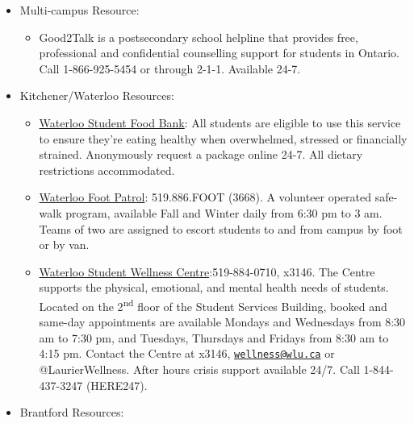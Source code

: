 \documentclass[
  letterpaper,
  DIV=11,
  numbers=noendperiod]{scrartcl}
\providecommand{\tightlist}{%
  \setlength{\itemsep}{0pt}\setlength{\parskip}{0pt}}\usepackage{longtable,booktabs,array}
\begin{document}
\begin{itemize}
\item
  Multi-campus Resource:

  \begin{itemize}
  \tightlist
  \item
    Good2Talk is a postsecondary school helpline that provides free,
    professional and confidential counselling support for students in
    Ontario. Call 1-866-925-5454 or through 2-1-1. Available 24-7.
  \end{itemize}
\item
  Kitchener/Waterloo Resources:

  \begin{itemize}
  \item
    \href{http://yourstudentsunion.ca/service/food-bank/}{Waterloo
    Student Food Bank}: All students are eligible to use this service to
    ensure they're eating healthy when overwhelmed, stressed or
    financially strained. Anonymously request a package online 24-7. All
    dietary restrictions accommodated.
  \item
    \href{http://yourstudentsunion.ca/service/foot-patrol/}{Waterloo
    Foot Patrol}: 519.886.FOOT (3668). A volunteer operated safe-walk
    program, available Fall and Winter daily from 6:30 pm to 3 am. Teams
    of two are assigned to escort students to and from campus by foot or
    by van.
  \item
    \href{https://students.wlu.ca/wellness-and-recreation/health-and-wellness/index.html}{Waterloo
    Student Wellness Centre}:519-884-0710, x3146. The Centre supports
    the physical, emotional, and mental health needs of students.
    Located on the 2\textsuperscript{nd} floor of the Student Services
    Building, booked and same-day appointments are available Mondays and
    Wednesdays from 8:30 am to 7:30 pm, and Tuesdays, Thursdays and
    Fridays from 8:30 am to 4:15 pm. Contact the Centre at x3146,
    \href{mailto:wellness@wlu.ca}{\nolinkurl{wellness@wlu.ca}} or
    @LaurierWellness. After hours crisis support available 24/7. Call
    1-844-437-3247 (HERE247).
  \end{itemize}
\item
  Brantford Resources:


\end{itemize}
\end{document}
